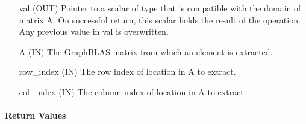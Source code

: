 \begin{itemize}[leftmargin=1in]
    \item[{\sf val}]   ({\sf OUT}) Pointer to a scalar of type that is 
    compatible with the domain of matrix {\sf A}. On successful return, this scalar 
    holds the result of the operation.  Any previous value in {\sf val} is 
    overwritten.

    \item[{\sf A}]     ({\sf IN}) The GraphBLAS matrix from which an element is
    extracted.
    
    \item[{\sf row\_index}] ({\sf IN}) The row index of location in {\sf A} 
    to extract.

    \item[{\sf col\_index}] ({\sf IN}) The column index of location in {\sf A} 
    to extract.
\end{itemize}

\paragraph{Return Values}

